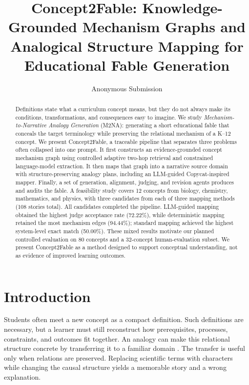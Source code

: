 \documentclass[letterpaper]{article} %
\title{Concept2Fable: Knowledge-Grounded Mechanism Graphs and Analogical Structure Mapping for Educational Fable Generation}
\author{Anonymous Submission}
\begin{document}
\maketitle

\begin{abstract}
Definitions state what a curriculum concept means, but they do not always make its conditions, transformations, and consequences easy to imagine. We study \emph{Mechanism-to-Narrative Analogy Generation} (M2NA): generating a short educational fable that conceals the target terminology while preserving the relational mechanism of a K--12 concept. We present Concept2Fable, a traceable pipeline that separates three problems often collapsed into one prompt. It first constructs an evidence-grounded concept mechanism graph using controlled adaptive two-hop retrieval and constrained language-model extraction. It then maps that graph into a narrative source domain with structure-preserving analogy plans, including an LLM-guided Copycat-inspired mapper. Finally, a set of generation, alignment, judging, and revision agents produces and audits the fable. A feasibility study covers 12 concepts from biology, chemistry, mathematics, and physics, with three candidates from each of three mapping methods (108 stories total). All candidates completed the pipeline. LLM-guided mapping obtained the highest judge acceptance rate (72.22\%), while deterministic mapping retained the most mechanism edges (94.44\%); standard mapping achieved the highest system-level exact match (50.00\%). These mixed results motivate our planned controlled evaluation on 80 concepts and a 32-concept human-evaluation subset. We present Concept2Fable as a method designed to support conceptual understanding, not as evidence of improved learning outcomes.
\end{abstract}

\section{Introduction}

Students often meet a new concept as a compact definition. Such definitions are necessary, but a learner must still reconstruct how prerequisites, processes, constraints, and outcomes fit together. An analogy can make this relational structure concrete by transferring it to a familiar domain \citep{gentner1983structure,gentner1997structure}. The transfer is useful only when relations are preserved. Replacing scientific terms with characters while changing the causal structure yields a memorable story and a wrong explanation.
\end{document}
